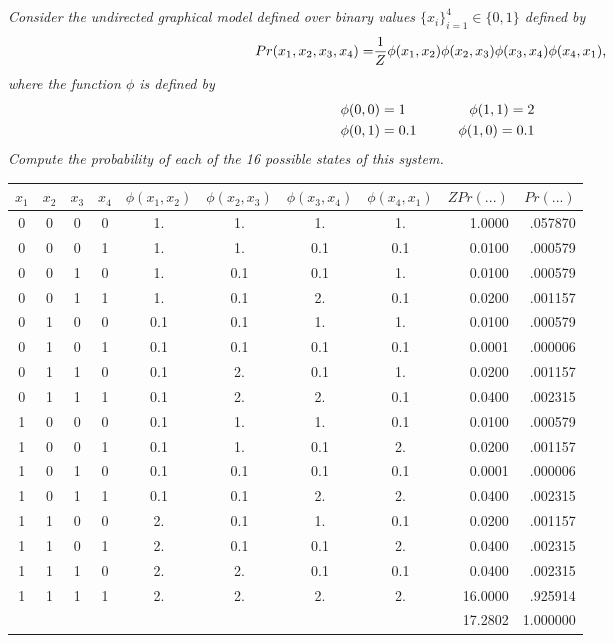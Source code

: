\documentclass[11pt]{report}
\begin{document}
\section{}
\textit{Consider the undirected graphical model defined over binary values $\{x_i\}_{i=1}^4 \in \{0, 1\}$ defined by }
\begin{equation} 
\begin{aligned}
Pr(x_1, x_2, x_3, x_4) = & \frac{1}{Z} \phi(x_1, x_2) \phi(x_2, x_3) \phi(x_3, x_4) \phi(x_4, x_1) \text{,} \notag
\end{aligned} 
\end{equation}
\textit{where the function $\phi$ is defined by}
\begin{equation} 
\begin{aligned}
&\phi(0,0) = 1 \quad \quad & \phi(1,1) = 2 \\
&\phi(0,1) = 0.1 \quad \quad &\phi(1,0) = 0.1 \notag
\end{aligned} 
\end{equation}
\textit{ Compute the probability of each of the 16 possible states of this system.}

\begin{table}[h]
\begin{tabular}{c c c c|c c c c r r}
\toprule
 $x_1$ & $x_2$ & $x_3$ & $x_4$  & $\phi(x_1, x_2)$ & $\phi(x_2, x_3)$ & $\phi(x_3, x_4)$ & $\phi(x_4, x_1)$ &
       $Z Pr(...)$ & $Pr(...)$ \\ \midrule
 0 & 0 & 0 & 0 & 1. & 1. & 1. & 1. & 1.0000 & .057870 \\
 0 & 0 & 0 & 1 & 1. & 1. & 0.1& 0.1 & 0.0100 & .000579 \\
 0 & 0 & 1 & 0 & 1. & 0.1 & 0.1  & 1. & 0.0100 & .000579 \\
 0 & 0 & 1 & 1 & 1. & 0.1 & 2. & 0.1 & 0.0200 & .001157 \\
 0 & 1 & 0 & 0 & 0.1 & 0.1  & 1. & 1.& 0.0100 & .000579 \\
 0 & 1 & 0 & 1 & 0.1 & 0.1 & 0.1 & 0.1 & 0.0001 & .000006 \\
 0 & 1 & 1 & 0 & 0.1 & 2. & 0.1 & 1. & 0.0200 & .001157 \\
 0 & 1 & 1 & 1 & 0.1 & 2. & 2. & 0.1 & 0.0400 & .002315 \\
 1 & 0 & 0 & 0 & 0.1 & 1. & 1. &  0.1 & 0.0100 & .000579 \\
 1 & 0 & 0 & 1 & 0.1 & 1. & 0.1 & 2. & 0.0200 & .001157 \\
 1 & 0 & 1 & 0 & 0.1 & 0.1 & 0.1 & 0.1 & 0.0001 & .000006 \\
 1 & 0 & 1 & 1 & 0.1 & 0.1 & 2. & 2. & 0.0400 & .002315 \\
 1 & 1 & 0 & 0 & 2.& 0.1 & 1. & 0.1 & 0.0200 & .001157 \\
 1 & 1 & 0 & 1 & 2. & 0.1 & 0.1 & 2. & 0.0400 & .002315 \\
 1 & 1 & 1 & 0 & 2. & 2. & 0.1 & 0.1 & 0.0400 & .002315 \\
 1 & 1 & 1 & 1 & 2. & 2. & 2. & 2. & 16.0000 & .925914 \\ \midrule
 & & & & & & & & 17.2802 & 1.000000 \\ \bottomrule
\end{tabular}
\end{table}
\FloatBarrier 
\end{document}
